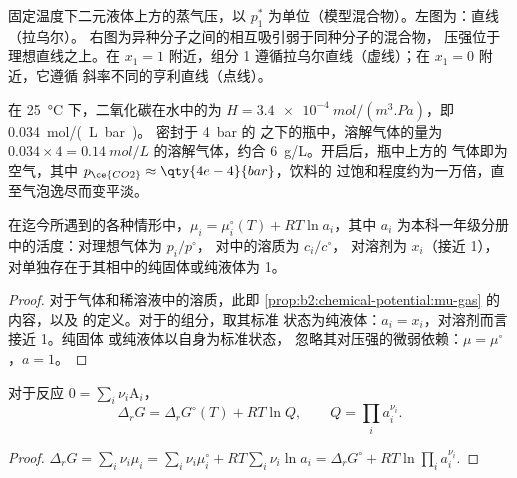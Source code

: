 \begin{omfigure}
{\small 固定温度下二元液体上方的蒸气压，以
$p_1^*$ 为单位（模型混合物）。左图为：直线（拉乌尔）。
右图为异种分子之间的相互吸引弱于同种分子的混合物，
压强位于理想直线之上。在 $x_1 = 1$ 附近，组分 1
遵循拉乌尔直线（虚线）；在 $x_1 = 0$ 附近，它遵循
斜率不同的亨利直线（点线）。}
\end{omfigure}

\begin{example}[二氧化碳在汽水中]\label{ex:b2:chemical-potential:soda}
在 \qty{25}{\celsius} 下，二氧化碳在水中的为 $H =
\qty{3.4e-4}{mol/(m^3.Pa)}$，即 \qty{0.034}{mol/(L.bar)}。
密封于 \qty{4}{bar} 的  之下的瓶中，溶解气体的量为 $0.034 \times 4 =
\qty{0.14}{mol/L}$ 的溶解气体，约合 \qty{6}{g/L}。开启后，瓶中上方的
气体即为空气，其中 $p_{\ce{CO2}} \approx \qty{4e-4}{bar}$，饮料的
过饱和程度约为一万倍，直至气泡逸尽而变平淡。
\end{example}

\begin{proposition}[由化学势求活度]\label{prop:b2:chemical-potential:activity}
在迄今所遇到的各种情形中，$\mu_i = \mu_i^\circ(T) + RT\ln a_i$，其中 $a_i$
为本科一年级分册中的活度：对理想气体为 $p_i/p^\circ$，
对中的溶质为 $c_i/c^\circ$，
对溶剂为 $x_i$（接近 1），对单独存在于其相中的纯固体或纯液体为 1。
\end{proposition}

\begin{proof}
对于气体和稀溶液中的溶质，此即
\cref{prop:b2:chemical-potential:mu-gas} 的内容，以及
的定义。对于的组分，取其标准
状态为纯液体：$a_i = x_i$，对溶剂而言接近 1。纯固体
或纯液体以自身为标准状态，
忽略其对压强的微弱依赖：$\mu = \mu^\circ$，$a = 1$。
\end{proof}

\begin{proposition}[反应吉布斯自由能与反应商]\label{prop:b2:chemical-potential:delta-g-q}
对于反应 $0 = \sum_i\nu_i\mathrm A_i$，
\[
  \Delta_r G = \Delta_r G^\circ(T) + RT\ln Q, \qquad Q = \prod_i a_i^{\nu_i} .
\]
\end{proposition}

\begin{proof}
$\Delta_r G = \sum_i\nu_i\mu_i = \sum_i\nu_i\mu_i^\circ + RT\sum_i\nu_i\ln a_i =
\Delta_r G^\circ + RT\ln\prod_i a_i^{\nu_i}$.
\end{proof}

